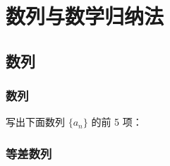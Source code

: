 \chapter{数列与数学归纳法}
\section{数列}
\subsection{数列}
\begin{Practice}
  \begin{question}
    \item 
    \item 
    \item 
    \item 
  \end{question}
\end{Practice}
\begin{example}
\end{example}
\begin{solution}
\end{solution}
\begin{Practice}
  写出下面数列 $\{a_n\}$ 的前 5 项：
  \begin{question}
    \item 
    \item 
    \item 
    \item 
  \end{question}
\end{Practice}

\subsection{等差数列}
\begin{Practice}
  \begin{question}
    \item 
    \item 
  \end{question}
\end{Practice}


\begin{Practice}
  \begin{question}
    \item 
    \item 
  \end{question}
\end{Practice}

